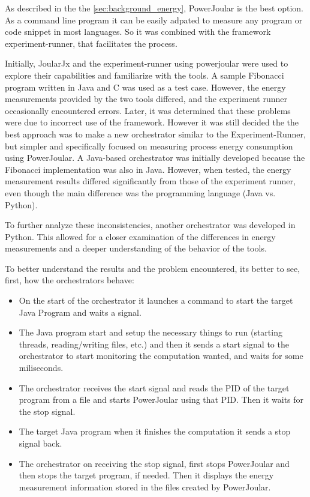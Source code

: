 \documentclass[sigplan]{acmart}
\begin{document}
As described in the the \ref{sec:background_energy}, PowerJoular is the best option. As a command line program it can be easily adpated to measure any program or code snippet in most languages. So it was combined with the framework experiment-runner, that facilitates the process.


Initially, JoularJx and the experiment-runner using powerjoular were used to explore their capabilities and familiarize with the tools. A sample Fibonacci program written in Java and C was used as a test case. However, the energy measurements provided by the two tools differed, and the experiment runner occasionally encountered errors. Later, it was determined that these problems were due to incorrect use of the framework. However it was still decided the the best approach was to make a new orchestrator similar to the Experiment-Runner, but simpler and specifically focused on measuring process energy consumption using PowerJoular. A Java-based orchestrator was initially developed because the Fibonacci implementation was also in Java. However, when tested, the energy measurement results differed significantly from those of the experiment runner, even though the main difference was the programming language (Java vs. Python).

To further analyze these inconsistencies, another orchestrator was developed in Python. This allowed for a closer examination of the differences in energy measurements and a deeper understanding of the behavior of the tools.

To better understand the results and the problem encountered, its better to see, first, how the orchestrators behave:


\begin{itemize}
  \item On the start of the orchestrator it launches a command to start the target Java Program and waits a signal.
  \item The Java program start and setup the necessary things to run (starting threads, reading/writing files, etc.) and then it sends a start signal to the orchestrator to start monitoring the computation wanted, and waits for some miliseconds. 
  \item The orchestrator receives the start signal and reads the PID of the target program from a file and starts PowerJoular using that PID. Then it waits for the stop signal.
  \item The target Java program when it finishes the computation it sends a stop signal back.
  \item The orchestrator on receiving the stop signal, first stops PowerJoular and then stops the target program, if needed. Then it displays the energy measurement information stored in the files created by PowerJoular. \\
\end{itemize}
\end{document}
